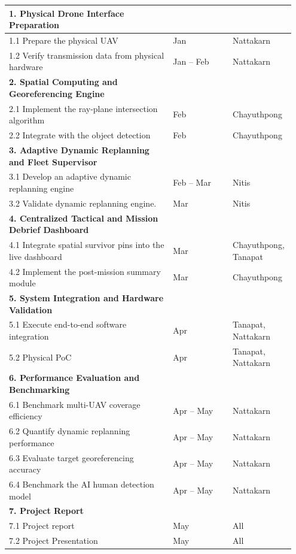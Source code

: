 \documentclass[12pt]{article}
\newcommand{\headerfont}{\fontsize{18pt}{21.6pt}\selectfont}
\newcommand{\tablefont}{\fontsize{14pt}{16.8pt}\selectfont}
\newcommand{\SubSubHead}[1]{\vspace{0.8em}\noindent{\headerfont\bfseries #1}\vspace{0.2em}\par}
\begin{document}
\SubSubHead{1.5.2 Second Semester}

{\tablefont
\begin{longtable}{|p{0.55\linewidth}|p{0.2\linewidth}|p{0.2\linewidth}|}
\hline
\rowcolor{orange!40}\textbf{1. Physical Drone Interface Preparation} & & \\
\hline
1.1 Prepare the physical UAV & Jan & Nattakarn \\
\hline
1.2 Verify transmission data from physical hardware & Jan -- Feb & Nattakarn \\
\hline
\rowcolor{orange!40}\textbf{2. Spatial Computing and Georeferencing Engine} & & \\
\hline
2.1 Implement the ray-plane intersection algorithm & Feb & Chayuthpong \\
\hline
2.2 Integrate with the object detection & Feb & Chayuthpong \\
\hline
\rowcolor{orange!40}\textbf{3. Adaptive Dynamic Replanning and Fleet Supervisor} & & \\
\hline
3.1 Develop an adaptive dynamic replanning engine & Feb -- Mar & Nitis \\
\hline
3.2 Validate dynamic replanning engine. & Mar & Nitis \\
\hline
\rowcolor{orange!40}\textbf{4. Centralized Tactical and Mission Debrief Dashboard} & & \\
\hline
4.1 Integrate spatial survivor pins into the live dashboard & Mar & Chayuthpong, Tanapat \\
\hline
4.2 Implement the post-mission summary module & Mar & Chayuthpong \\
\hline
\rowcolor{orange!40}\textbf{5. System Integration and Hardware Validation} & & \\
\hline
5.1 Execute end-to-end software integration & Apr & Tanapat, Nattakarn \\
\hline
5.2 Physical PoC & Apr & Tanapat, Nattakarn \\
\hline
\rowcolor{orange!40}\textbf{6. Performance Evaluation and Benchmarking} & & \\
\hline
6.1 Benchmark multi-UAV coverage efficiency & Apr -- May & Nattakarn \\
\hline
6.2 Quantify dynamic replanning performance & Apr -- May & Nattakarn \\
\hline
6.3 Evaluate target georeferencing accuracy & Apr -- May & Nattakarn \\
\hline
6.4 Benchmark the AI human detection model & Apr -- May & Nattakarn \\
\hline
\rowcolor{orange!40}\textbf{7. Project Report} & & \\
\hline
7.1 Project report & May & All \\
\hline
7.2 Project Presentation & May & All \\
\hline
\end{longtable}
}
\end{document}
